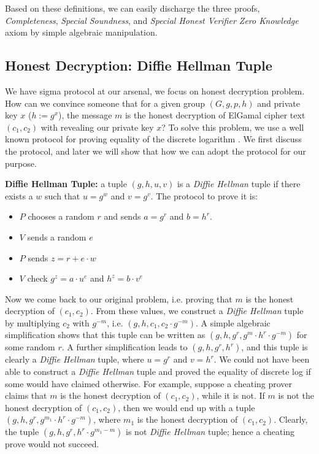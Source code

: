 Based on these definitions, we can easily discharge the three proofs, \textit{Completeness}, 
\textit{Special Soundness}, and \textit{Special Honest Verifier Zero Knowledge} axiom by simple 
algebraic manipulation.

\subsection{Honest Decryption: Diffie Hellman Tuple}
We have sigma protocol at our arsenal, we focus on honest decryption 
problem. How can we convince someone that for a given group 
$(G, g, p, h)$ and private key $x$ ($h := g^x$), the message $m$ is the 
honest decryption of ElGamal cipher text $(c_{1}, c_{2})$ with revealing 
our private key $x$? To solve this problem, we use a well known protocol
for proving equality of the discrete logarithm \citep{10.1007/3-540-69053-0_9}.
We first discuss the protocol, and later we will show that how we can adopt 
the protocol for our purpose. 

\textbf{Diffie Hellman Tuple:} a tuple $(g, h, u, v)$ is 
 a \textit{Diffie Hellman} tuple if there exists a $w$ such that 
 $u = g^w$ and $v = g^v$.  The protocol to prove it is:
 
 \begin{itemize}
 \item $P$ chooses a random $r$ and sends $a=g^r$ and $b = h^r$.
 \item $V$ sends a random $e$
 \item $P$ sends $z =r+ e \cdot w$
 \item $V$ check $g^z = a \cdot u^e$ and $h^z = b\cdot v^e$ 
 \end{itemize}
 

Now we come back to our original problem, i.e. proving that $m$ is the honest 
decryption of $(c_{1}, c_{2})$. From these values, we construct a \textit{Diffie Hellman} tuple
by multiplying $c_{2}$ with $g^{-m}$, i.e.
$(g, h, c_{1}, c_{2} \cdot g^{-m})$. A simple algebraic simplification shows that 
this tuple can be written as $(g, h, g^r, g^m \cdot h^r \cdot g^{-m})$ for some 
random $r$. A further simplification leads to $(g, h, g^r, h^r)$, and 
this tuple is clearly a \textit{Diffie Hellman} tuple, where $u = g^r$ and $v = h^r$. 
We could not have been able to construct a  \textit{Diffie Hellman} tuple and proved 
the equality of discrete log if some would have claimed otherwise. For example, 
suppose a cheating prover  claims that $m$ is the honest decryption of $(c_{1}, c_{2})$,
while it is not. 
If $m$ is not the honest decryption of $(c_{1}, c_{2})$, then we would end up with 
a tuple $(g, h, g^r, g^{m_{1}} \cdot h^r \cdot g^{-m})$, where $m_{1}$ is the honest 
decryption of $(c_{1}, c_{2})$.  Clearly, the tuple $(g, h, g^r, h^r \cdot g^{m_{1} - m})$ is not 
\textit{Diffie Hellman} tuple; hence a cheating prove would not succeed. 




